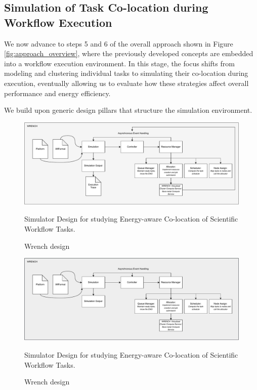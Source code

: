 \subsection{Simulation of Task Co-location during Workflow Execution}
\label{sec:simulation_environment}

We now advance to steps 5 and 6 of the overall approach shown in Figure \ref{fig:approach_overview}, where the previously developed concepts are embedded into a workflow execution environment. In this stage, the focus shifts from modeling and clustering individual tasks to simulating their co-location during execution, eventually allowing us to evaluate how these strategies affect overall performance and energy efficiency.

\label{sec:design_pillars}

We build upon generic design pillars that structure the simulation environment.

\begin{figure}[H]
    \centering
    \includegraphics[scale=0.5]{fig/04/04-approach-sim.pdf}
    \caption{Wrench design}
    \label{fig:04-sim-design}
    \tiny
    Simulator Design for studying Energy-aware Co-location of Scientific Workflow Tasks.
\end{figure}

\begin{figure}[H]
    \centering
    \includegraphics[scale=0.5]{fig/04/04-wrench-design.pdf}
    \caption{Wrench design}
    \label{fig:04-wrench-design}
    \tiny
    Simulator Design for studying Energy-aware Co-location of Scientific Workflow Tasks.
\end{figure}

